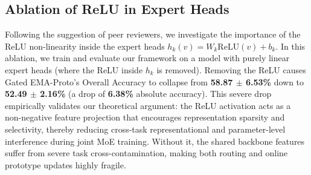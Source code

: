 \documentclass{article}
\theoremstyle{plain}
\theoremstyle{definition}
\theoremstyle{remark}
\begin{document}
\subsection{Ablation of ReLU in Expert Heads}
Following the suggestion of peer reviewers, we investigate the importance of the ReLU non-linearity inside the expert heads $h_k(v) = W_k \text{ReLU}(v) + b_k$. In this ablation, we train and evaluate our framework on a model with purely linear expert heads (where the ReLU inside $h_k$ is removed). Removing the ReLU causes Gated EMA-Proto's Overall Accuracy to collapse from \textbf{58.87 $\pm$ 6.53\%} down to \textbf{52.49 $\pm$ 2.16\%} (a drop of \textbf{6.38\%} absolute accuracy). This severe drop empirically validates our theoretical argument: the ReLU activation acts as a non-negative feature projection that encourages representation sparsity and selectivity, thereby reducing cross-task representational and parameter-level interference during joint MoE training. Without it, the shared backbone features suffer from severe task cross-contamination, making both routing and online prototype updates highly fragile.
\end{document}
